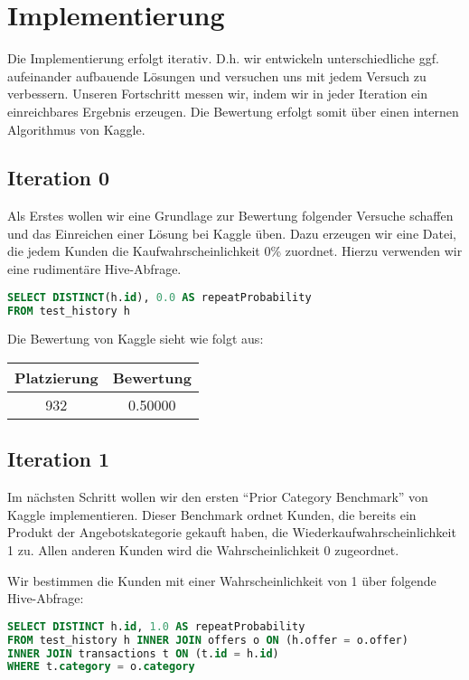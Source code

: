 \section{Implementierung}

Die Implementierung erfolgt iterativ. D.h. wir entwickeln unterschiedliche ggf. aufeinander aufbauende Lösungen
und versuchen uns mit jedem Versuch zu verbessern. Unseren Fortschritt messen wir, indem wir in jeder
Iteration ein einreichbares Ergebnis erzeugen. Die Bewertung erfolgt somit über einen internen Algorithmus
von Kaggle.

\subsection{Iteration 0}

Als Erstes wollen wir eine Grundlage zur Bewertung folgender Versuche schaffen und das Einreichen einer
Lösung bei Kaggle üben. Dazu erzeugen wir eine Datei, die jedem Kunden die Kaufwahrscheinlichkeit 0\%
zuordnet. Hierzu verwenden wir eine rudimentäre Hive-Abfrage.

\begin{lstlisting}[language=SQL]
SELECT DISTINCT(h.id), 0.0 AS repeatProbability 
FROM test_history h
\end{lstlisting}

Die Bewertung von Kaggle sieht wie folgt aus:

\begin{tabular}{|c|c|}
	\hline \textbf{Platzierung} & \textbf{Bewertung} \\ 
	\hline 932 & 0.50000  \\ 
	\hline 
\end{tabular}

\subsection{Iteration 1}

Im nächsten Schritt wollen wir den ersten "`Prior Category Benchmark"' von Kaggle implementieren.
Dieser Benchmark ordnet Kunden, die bereits ein Produkt der Angebotskategorie gekauft haben, die
Wiederkaufwahrscheinlichkeit 1 zu. Allen anderen Kunden wird die Wahrscheinlichkeit 0 zugeordnet.

Wir bestimmen die Kunden mit einer Wahrscheinlichkeit von 1 über folgende Hive-Abfrage:
\begin{lstlisting}[language=SQL]
SELECT DISTINCT h.id, 1.0 AS repeatProbability
FROM test_history h INNER JOIN offers o ON (h.offer = o.offer)
INNER JOIN transactions t ON (t.id = h.id)
WHERE t.category = o.category
\end{lstlisting}

